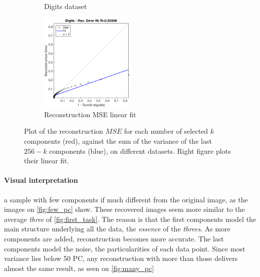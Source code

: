 \documentclass[a4paper, 10pt]{article}
\begin{document}
\begin{figure}[h]
\begin{adjustwidth}{-1cm}{-1cm}
\begin{subfigure}[t]{0.3\linewidth}
      \caption{Digits dataset}
      \label{fig:digits_rec}
    \end{subfigure}
    \begin{subfigure}[t]{0.3\linewidth}
      \includegraphics[width=1\linewidth, height=4.7cm]{./lab3/PCA/regression_digits.png}
      \caption{Reconstruction MSE linear fit}
      \label{fig:regression}
    \end{subfigure}
    \end{adjustwidth}
    \caption{Plot of the reconstruction $MSE$ for each number of selected $k$ components (red),
    against the sum of the variance of the last $256-k$ components (blue), on 
  different datasets. Right figure plots their linear fit.}
    \label{fig:rec_vs_cumsum}
  \end{figure}
  

  \paragraph{Visual interpretation} a sample with few components 
  if much different from the original image, as the images on \autoref{fig:few_pc} 
  show. These recovered images seem more similar to the average \emph{three} of 
  \autoref{fig:first_task}. The reason is that the first components model the
  main structure underlying all the data, the \emph{essence} of the \emph{threes}.
  As more components are added, reconstruction becomes more accurate.  The last 
  components model the noise, the particularities of each data point. Since
  most variance lies below 50 PC, any reconstruction with more than those delivers
  almost the same result, as seen on \autoref{fig:many_pc}
  
\end{document}
